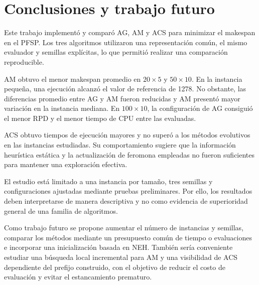 \documentclass[journal]{IEEEtran}
\begin{document}
\section{Conclusiones y trabajo futuro}

Este trabajo implementó y comparó AG, AM y ACS para minimizar el makespan en el PFSP. Los tres algoritmos utilizaron una representación común, el mismo evaluador y semillas explícitas, lo que permitió realizar una comparación reproducible.

AM obtuvo el menor makespan promedio en $20\times5$ y $50\times10$. En la instancia pequeña, una ejecución alcanzó el valor de referencia de 1278. No obstante, las diferencias promedio entre AG y AM fueron reducidas y AM presentó mayor variación en la instancia mediana. En $100\times10$, la configuración de AG consiguió el menor RPD y el menor tiempo de CPU entre las evaluadas.

ACS obtuvo tiempos de ejecución mayores y no superó a los métodos evolutivos en las instancias estudiadas. Su comportamiento sugiere que la información heurística estática y la actualización de feromona empleadas no fueron suficientes para mantener una exploración efectiva.

El estudio está limitado a una instancia por tamaño, tres semillas y configuraciones ajustadas mediante pruebas preliminares. Por ello, los resultados deben interpretarse de manera descriptiva y no como evidencia de superioridad general de una familia de algoritmos.

Como trabajo futuro se propone aumentar el número de instancias y semillas, comparar los métodos mediante un presupuesto común de tiempo o evaluaciones e incorporar una inicialización basada en NEH. También sería conveniente estudiar una búsqueda local incremental para AM y una visibilidad de ACS dependiente del prefijo construido, con el objetivo de reducir el costo de evaluación y evitar el estancamiento prematuro.
\end{document}
